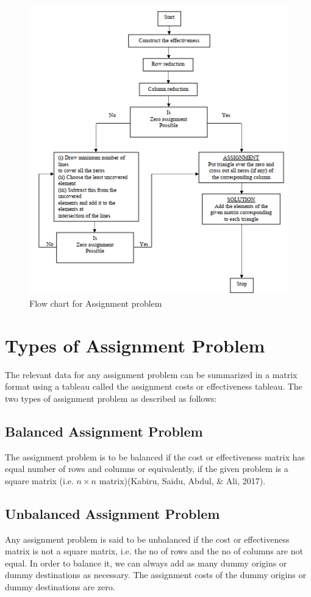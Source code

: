 \documentclass[11pt]{report}
\begin{document}
	\begin{figure}[!h]
		\centering
		\includegraphics[width=1.02\linewidth]{mt}
		\caption{Flow chart for Assignment problem}
	\end{figure}
	\newpage
	\section{Types of Assignment Problem}
	The relevant data for any assignment problem can be summarized in a matrix format using a tableau called the assignment costs or effectiveness tableau. The two types of assignment problem as described as follows:
	
	\subsection{Balanced Assignment Problem}
	The assignment problem is to be balanced if the cost or effectiveness matrix has equal number of rows and columns or equivalently, if the given problem is a square matrix (i.e. $n\times n$ matrix)(Kabiru, Saidu, Abdul, \& Ali, 2017).
	
	\subsection{Unbalanced Assignment Problem}
	Any assignment problem is said to be unbalanced if the cost or effectiveness matrix is not a square matrix, i.e. the no of rows and the no of columns are not equal. In order to balance it, we can always add as many dummy origins or dummy destinations as necessary. The assignment costs of the dummy origins or dummy destinations are zero.
	
\end{document}
